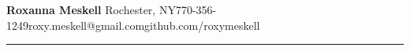 \documentclass[10pt]{article} %
\newcommand{\makeheading}[2][]%
{\hspace*{-\marginparsep minus \marginparwidth}%
	\begin{minipage}[t]{\textwidth+\marginparwidth+\marginparsep}%
		{\LARGE \bfseries #2 \hfill #1}\\[-0.15\baselineskip]%
		\rule{\columnwidth}{1pt}%
	\end{minipage}}
\renewcommand{\section}[1]{\pagebreak[3]%
	\par %
	\phantomsection\addcontentsline{toc}{section}{#1}%
	\noindent\llap{\scshape\smash{\parbox[t]{\marginparwidth}{\hyphenpenalty=10000\raggedright #1}}}%
	\vspace{-\baselineskip}\par}
\begin{document}
	\hspace*{-\marginparsep minus \marginparwidth}%
	\begin{minipage}[t]{\textwidth+\marginparwidth+\marginparsep}%
		{\LARGE \bfseries Roxanna Meskell}%
		\hspace*{1em}Rochester, NY\hspace*{.5em}\textbar\hspace*{.5em}770-356-1249\hspace*{.5em}\textbar\hspace*{.5em}roxy.meskell@gmail.com\hspace*{.5em}\textbar\hspace*{.5em}github.com/roxymeskell
		\\[-0.5\baselineskip]
		\rule{\columnwidth}{1pt}%
	\end{minipage}
	\newlength{\rcollength}\setlength{\rcollength}{2in}%
	\newlength{\spacewidth}\setlength{\spacewidth}{20pt}%
	\newcommand\spacechar{$|$}%
%
%
%
\end{document}
